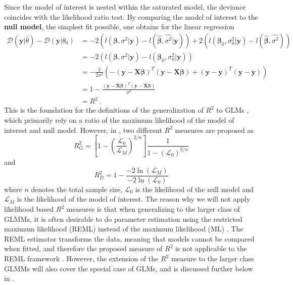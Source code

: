 Since the model of interest is nested within the saturated model, the deviance coincides with the likelihood ratio test. 
By comparing the model of interest to the \textbf{null model}, the simplest fit possible, one obtains for the linear regression
\begin{equation}
    \begin{aligned}
    \mathcal{D}(\mathbf{y}\lvert \hat{\theta})- \mathcal{D}(\mathbf{y}\lvert \theta_0) &= -2\left( l(\boldsymbol{\beta}, \sigma^2 \lvert \mathbf{y}) - l(\boldsymbol{\hat{\beta}}, \hat{\sigma^2} \lvert \mathbf{y})  \right) + 2\left( l(\boldsymbol{\beta}_0, \sigma^2_0 \lvert \mathbf{y}) - l(\boldsymbol{\hat{\beta}}, \hat{\sigma^2})  \right) \\
    &= -2\left( l(\boldsymbol{\beta}, \sigma^2 \lvert \mathbf{y})  -  l(\boldsymbol{\beta}_0, \sigma^2_0 \lvert \mathbf{y})   \right) \\
    & = - \frac{2}{2\sigma^2}\left( - (\mathbf{y}-\mathbf{X}\boldsymbol{\beta})^T(\mathbf{y}-\mathbf{X}\boldsymbol{\beta})  + (\mathbf{y}-\mathbf{\overline{y}})^T(\mathbf{y}-\mathbf{\overline{y}}) \right) \\
    & = 1 -  \frac{(\mathbf{y}-\mathbf{X}\boldsymbol{\beta})^T(\mathbf{y}-\mathbf{X}\boldsymbol{\beta})}{\sigma^2} \\
    &= R^2 \ .
    \end{aligned}
\end{equation}
This is the foundation for the definitions of the generalization of $R^2$ to GLMs \citep{nakagawa2013general}, which primarily rely on a ratio of the maximum likelihood of the model of interest and null model.
However, in \citet{nakagawa2013general}, two different $R^2$ measures are proposed as
\begin{equation}
    R^2_G = \left[1- \left(\frac{\mathcal{L}_0}{\mathcal{L}_M}\right) ^{2/n} \right] \frac{1}{1-(\mathcal{L}_0)^{2/n}}
\end{equation}
and 
\begin{equation}
    R^2_D = 1 - \frac{-2\ln(\mathcal{L}_M)}{-2 \ln(\mathcal{L}_0)}
\end{equation}
where $n$ denotes the total sample size, $\mathcal{L}_0$ is the likelihood of the null model and $\mathcal{L}_M$ is the likelihood of the model of interest.
The reason why we will not apply likelihood based $R^2$ measures is that when generalizing to the larger class of GLMMs, it is often desirable to do parameter estimation using the restricted maximum likelihood (REML) instead of the maximum likelihood (ML) \citep{GLMM_book}.
The REML estimator transforms the data, meaning that models cannot be compared when fitted, and therefore the proposed measure of $R^2$ is not applicable to the REML framework \citep{nakagawa2013general}.
However, the extension of the $R^2$ measure to the larger class GLMMs will also cover the special case of GLMs, and is discussed further below in .

